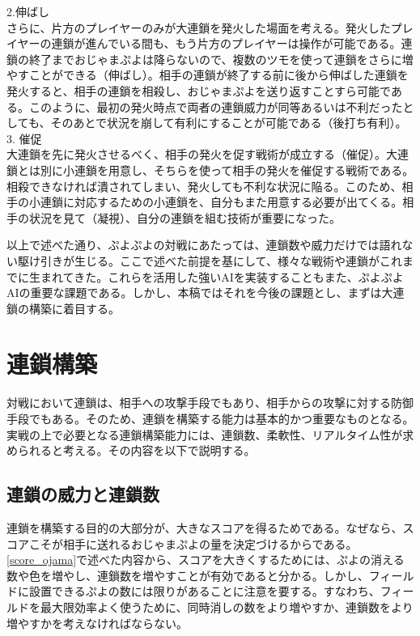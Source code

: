 \documentclass[12pt]{jreport}
\begin{document}
2.伸ばし\\
さらに、片方のプレイヤーのみが大連鎖を発火した場面を考える。発火したプレイヤーの連鎖が進んでいる間も、もう片方のプレイヤーは操作が可能である。連鎖の終了までおじゃまぷよは降らないので、複数のツモを使って連鎖をさらに増やすことができる（伸ばし）。相手の連鎖が終了する前に後から伸ばした連鎖を発火すると、相手の連鎖を相殺し、おじゃまぷよを送り返すことすら可能である。このように、最初の発火時点で両者の連鎖威力が同等あるいは不利だったとしても、そのあとで状況を崩して有利にすることが可能である（後打ち有利）。
\\[.5em]

3. 催促\\
大連鎖を先に発火させるべく、相手の発火を促す戦術が成立する（催促）。大連鎖とは別に小連鎖を用意し、そちらを使って相手の発火を催促する戦術である。相殺できなければ潰されてしまい、発火しても不利な状況に陥る。このため、相手の小連鎖に対応するための小連鎖を、自分もまた用意する必要が出てくる。相手の状況を見て（凝視）、自分の連鎖を組む技術が重要になった。

以上で述べた通り、ぷよぷよの対戦にあたっては、連鎖数や威力だけでは語れない駆け引きが生じる。ここで述べた前提を基にして、様々な戦術や連鎖がこれまでに生まれてきた。これらを活用した強いAIを実装することもまた、ぷよぷよAIの重要な課題である。しかし、本稿ではそれを今後の課題とし、まずは大連鎖の構築に着目する。


\section{連鎖構築}
対戦において連鎖は、相手への攻撃手段でもあり、相手からの攻撃に対する防御手段でもある。そのため、連鎖を構築する能力は基本的かつ重要なものとなる。実戦の上で必要となる連鎖構築能力には、連鎖数、柔軟性、リアルタイム性が求められると考える。その内容を以下で説明する。

\subsection{連鎖の威力と連鎖数}
連鎖を構築する目的の大部分が、大きなスコアを得るためである。なぜなら、スコアこそが相手に送れるおじゃまぷよの量を決定づけるからである。\ref{score_ojama}で述べた内容から、スコアを大きくするためには、ぷよの消える数や色を増やし、連鎖数を増やすことが有効であると分かる。しかし、フィールドに設置できるぷよの数には限りがあることに注意を要する。すなわち、フィールドを最大限効率よく使うために、同時消しの数をより増やすか、連鎖数をより増やすかを考えなければならない。
\end{document}
